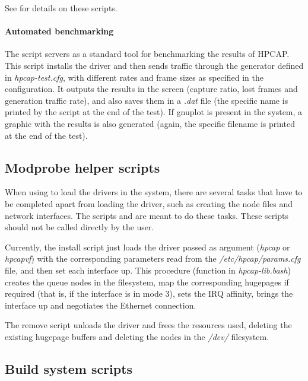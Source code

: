 \documentclass[oneside]{hpman}
\begin{document}
See  for details on these scripts.

\paragraph{Automated benchmarking} The script  servers as a standard tool for benchmarking the results of HPCAP. This script installs the driver and then sends traffic through the generator defined in \textit{hpcap-test.cfg}, with different rates and frame sizes as specified in the configuration. It outputs the results in the screen (capture ratio, lost frames and generation traffic rate), and also saves them in a \textit{.dat} file (the specific name is printed by the script at the end of the test). If gnuplot is present in the system, a graphic with the results is also generated (again, the specific filename is printed at the end of the test).

\subsection{Modprobe helper scripts}
\label{sec:scripts:modprobe}

When using  to load the drivers in the system, there are several tasks that have to be completed apart from loading the driver, such as creating the node files and network interfaces. The scripts  and  are meant to do these tasks. These scripts should not be called directly by the user.

Currently, the install script just loads the driver passed as argument (\textit{hpcap} or \textit{hpcapvf}) with the corresponding parameters read from the \textit{/etc/hpcap/params.cfg} file, and then set each interface up. This procedure (function  in \textit{hpcap-lib.bash}) creates the queue nodes in the  filesystem, map the corresponding hugepages if required (that is, if the interface is in mode 3), sets the IRQ affinity, brings the interface up and negotiates the Ethernet connection.

The remove script unloads the driver and frees the resources used, deleting the existing hugepage buffers and deleting the nodes in the \textit{/dev/} filesystem.

\subsection{Build system scripts}
\end{document}
